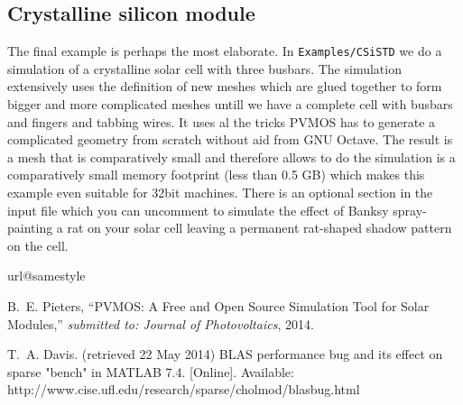 \documentclass[noshowpacs,preprintnumbers,amsmath,amssymb, letter]{revtex4}
\begin{document}
\subsection{Crystalline silicon module}
The final example is perhaps the most elaborate. In \texttt{Examples/CSiSTD} we do a simulation of a crystalline solar cell with three busbars. The simulation extensively uses the definition of new meshes which are glued together to form bigger and more complicated meshes untill we have a complete cell with busbars and fingers and tabbing wires. It uses al the tricks PVMOS has to generate a complicated geometry from scratch without aid from GNU Octave. The result is a mesh that is comparatively small and therefore allows to do the simulation is a comparatively small memory footprint (less than 0.5 GB) which makes this example even suitable for 32bit machines. There is an optional section in the input file which you can uncomment to simulate the effect of Banksy spray-painting a rat on your solar cell leaving a permanent rat-shaped shadow pattern on the cell. 
\begin{thebibliography}{10}
\providecommand{\url}[1]{#1}
\csname url@samestyle\endcsname
\providecommand{\newblock}{\relax}
\providecommand{\bibinfo}[2]{#2}
\providecommand{\BIBentrySTDinterwordspacing}{\spaceskip=0pt\relax}
\providecommand{\BIBentryALTinterwordstretchfactor}{4}
\providecommand{\BIBentryALTinterwordspacing}{\spaceskip=\fontdimen2\font plus
\BIBentryALTinterwordstretchfactor\fontdimen3\font minus
  \fontdimen4\font\relax}
\providecommand{\BIBforeignlanguage}[2]{{%
\expandafter\ifx\csname l@#1\endcsname\relax
\typeout{** WARNING: IEEEtran.bst: No hyphenation pattern has been}%
\typeout{** loaded for the language `#1'. Using the pattern for}%
\typeout{** the default language instead.}%
\else
\language=\csname l@#1\endcsname
\fi
#2}}
\providecommand{\BIBdecl}{\relax}
\BIBdecl


B.~E. Pieters, ``{PVMOS: A Free and Open Source Simulation Tool for Solar Modules},'' \emph{submitted to: Journal of Photovoltaics}, 2014.

T.~A. Davis. (retrieved 22 May 2014) {BLAS performance bug and its effect on
  sparse "bench" in MATLAB 7.4}. [Online]. Available:
  \url{http://www.cise.ufl.edu/research/sparse/cholmod/blasbug.html}
\end{thebibliography}
\end{document}

